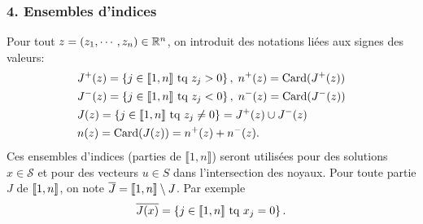 \subsubsection*{4. Ensembles d'indices}\noindent
Pour tout $z = (z_1, \cdots, z_n) \in \mathbb{R}^n$, on introduit des notations liées aux signes des valeurs:
\[
\begin{aligned}
  &J^+(z) = \left\lbrace j \in \llbracket 1 ,n \rrbracket \text{ tq } z_j > 0\right\rbrace, \; n^+(z) = \operatorname{Card} (J^+(z))\\ 
  &J^-(z) = \left\lbrace j \in \llbracket 1 ,n \rrbracket \text{ tq } z_j < 0\right\rbrace, \; n^-(z) = \operatorname{Card} (J^-(z))\\
  &J(z) = \left\lbrace j \in \llbracket 1 ,n \rrbracket \text{ tq } z_j \neq 0\right\rbrace = J^+(z) \cup J^-(z)\\
  &n(z) = \operatorname{Card} (J(z)) = n^+(z) + n^-(z).
\end{aligned}
\]
Ces ensembles d'indices (parties de $\llbracket 1,n \rrbracket$) seront utilisées pour des solutions $x\in \mathcal{S}$ et pour des vecteurs $u\in S$ dans l'intersection des noyaux.\newline
Pour toute partie $J$ de $\llbracket 1,n\rrbracket$, on note $\overline{J} = \llbracket 1,n\rrbracket \setminus J$. Par exemple 
\[
  \overline{J(x)} = \left\lbrace j \in \llbracket 1,n\rrbracket \text{ tq } x_j = 0\right\rbrace.
\]

\newpage
